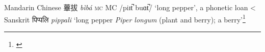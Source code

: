 \begin{etymology}\label{ety:biba}
Mandarin Chinese {蓽拔} \textit{bìbá} \textsc{mc} MC /piɪt̚  buɑt̚/ `long pepper', a phonetic loan
< Sanskrit {पिप्पलि } \textit{pippali} `long pepper \textit{Piper longum} (plant and berry); a berry'\footnote{\textcite[626]{monier-williams_sanskrit-english_1899}}
\end{etymology}